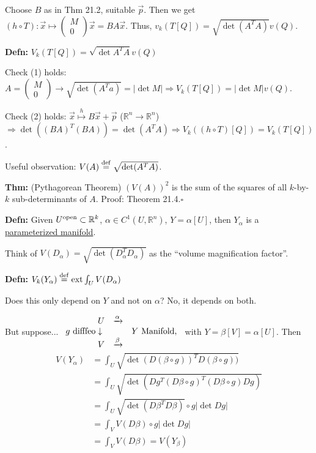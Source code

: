 \documentclass[10pt,letterpaper]{article}
\newcommand{\n}{\hfill\break}
\newcommand{\defn}[1]{\par\noindent\settowidth{\hangindent}{\textbf{Defn: }}\textbf{Defn: }#1\n}
\newcommand{\thm}[1]{\par\noindent\settowidth{\hangindent}{\textbf{Thm: }}\textbf{Thm: }#1\n}
\newcommand{\proven}{\;$\square$\n}
\newcommand{\ptxt}[1]{\textrm{\textnormal{#1}}}
\newcommand{\reals}{\mathbb{R}}
\newcommand{\R}{\reals}
\newcommand{\abs}[1]{\left|#1\right|}
\newcommand{\of}{\circ}
\newcommand{\tpose}{^{T}}
\newcommand{\extint}{\ptxt{ext}\int}
\newcommand{\paren}[1]{\left(#1\right)}
\begin{document}
\par\noindent Choose $B$ as in Thm 21.2, suitable $\vec{p}$. Then we get $(h\of{}T):\vec{x}\mapsto\paren{\begin{array}{c}M\\ 0\end{array}}\vec{x}=BA\vec{x}$.\n
Thus, $v_{k}(T[Q])=\sqrt{\det(A\tpose{}A)}v(Q)$.\n

\defn{$V_{k}(T[Q])=\sqrt{\det{}A\tpose{}A}v(Q)$}

\par\noindent Check (1) holds: $A=\paren{\begin{array}{c}M\\ 0\end{array}}\to\sqrt{\det(A\tpose{}a)}=\abs{\det{}M}\Rightarrow{}V_{k}(T[Q])=\abs{\det{}M}v(Q)$. \checkmark\n

\par\noindent Check (2) holds: $\vec{x}\overset{h}{\mapsto}B\vec{x}+\vec{p}$ ($\R^{n}\to\R^{n}$) $\Rightarrow\det((BA)\tpose(BA))=\det(A\tpose{}A)\Rightarrow{}V_{k}((h\of{}T)[Q])=V_{k}(T[Q])$.\n

\par\noindent Useful observation: $V(A)\overset{\ptxt{def}}{=}\sqrt{\det(A\tpose{}A)}$.\n

\thm{(Pythagorean Theorem) $(V(A))^{2}$ is the sum of the squares of all $k$-by-$k$ sub-determinants of $A$.\n
Proof: Theorem 21.4.\proven}

\defn{Given $U^{\ptxt{open}}\subset\R^{k}$, $\alpha\in{}C^{1}(U,\R^{n})$, $Y=\alpha[U]$, then $Y_{\alpha}$ is a \underline{parameterized manifold}.}

\par\noindent Think of $V(D_{\alpha})=\sqrt{\det(D_{\alpha}\tpose{}D_{\alpha})}$ as the ``volume magnification factor''.\n

\defn{$V_{k}(Y_{\alpha})\overset{\ptxt{def}}{=}\extint_{U}V(D_{\alpha})$}

\par\noindent Does this only depend on $Y$ and not on $\alpha$?\n
No, it depends on both.\n

\par\noindent But suppose...\n
$\begin{array}{rcc}U & \xrightarrow{\alpha} & \\ g\ptxt{ difffeo}\downarrow{} & & Y\ptxt{ Manifold,}\\ V & \xrightarrow{\beta} & \end{array}$ with $Y=\beta[V]=\alpha[U]$. Then
\begin{align*}
V(Y_{\alpha}) & =\int_{U}\sqrt{\det(D(\beta\of{}g))\tpose{}D(\beta\of{}g))}\\
 & =\int_{U}\sqrt{\det(Dg\tpose(D\beta\of{}g)\tpose(D\beta\of{}g)Dg)}\\
 & =\int_{U}\sqrt{\det(D\beta\tpose{}D\beta)}\of{}g\abs{\det{}Dg}\\
 & =\int_{V}V(D\beta)\of{}g\abs{\det{}Dg}\\
 & =\int_{V}V(D\beta)=V(Y_{\beta})
\end{align*}
\end{document}
